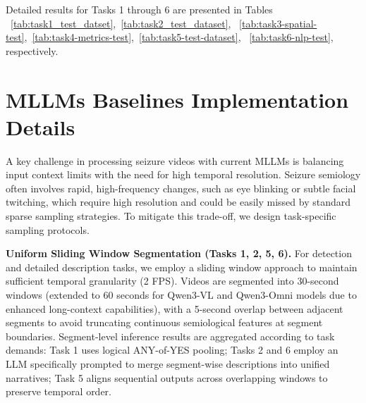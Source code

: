 \documentclass{article}
\theoremstyle{plain}
\theoremstyle{definition}
\theoremstyle{remark}
\begin{document}
Detailed results for Tasks 1 through 6 are presented in Tables ~\ref{tab:task1_test_datset},~\ref{tab:task2_test_dataset}, ~\ref{tab:task3-spatial-test},~\ref{tab:task4-metrics-test},~\ref{tab:task5-test-dataset}, ~\ref{tab:task6-nlp-test}, respectively.














\section{MLLMs Baselines Implementation Details}
\label{sec:baseline_sample}

A key challenge in processing seizure videos with current MLLMs is balancing input context limits with the need for high temporal resolution. Seizure semiology often involves rapid, high-frequency changes, such as eye blinking or subtle facial twitching, which require high resolution and could be easily missed by standard sparse sampling strategies. To mitigate this trade-off, we design task-specific sampling protocols.

\textbf{Uniform Sliding Window Segmentation (Tasks 1, 2, 5, 6).}
For detection and detailed description tasks, we employ a sliding window approach to maintain sufficient temporal granularity (2 FPS). Videos are segmented into 30-second windows (extended to 60 seconds for Qwen3-VL and Qwen3-Omni models due to enhanced long-context capabilities), with a 5-second overlap between adjacent segments to avoid truncating continuous semiological features at segment boundaries. Segment-level inference results are aggregated according to task demands: Task 1 uses logical ANY-of-YES pooling; Tasks 2 and 6 employ an LLM specifically prompted to merge segment-wise descriptions into unified narratives; Task 5 aligns sequential outputs across overlapping windows to preserve temporal order.
\end{document}
